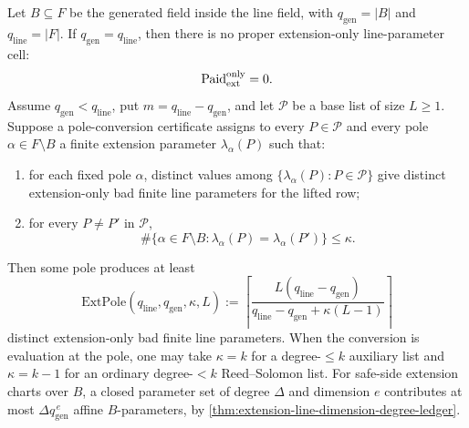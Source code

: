 \begin{proposition}\label{prop:v13-extension}
Let $B\subseteq F$ be the generated field inside the line field, with $q_{\mathrm{gen}}=|B|$ and $q_{\mathrm{line}}=|F|$.  If $q_{\mathrm{gen}}=q_{\mathrm{line}}$, then there is no proper extension-only line-parameter cell:
\[
        \operatorname{Paid}_{\mathrm{ext}}^{\mathrm{only}}=0.
\]
Assume $q_{\mathrm{gen}}<q_{\mathrm{line}}$, put $m=q_{\mathrm{line}}-q_{\mathrm{gen}}$, and let $\mathcal P$ be a base list of size $L\ge1$.  Suppose a pole-conversion certificate assigns to every $P\in\mathcal P$ and every pole $\alpha\in F\setminus B$ a finite extension parameter $\lambda_\alpha(P)$ such that:
\begin{enumerate}[label=\textup{(\roman*)}]
\item for each fixed pole $\alpha$, distinct values among $\{\lambda_\alpha(P):P\in\mathcal P\}$ give distinct extension-only bad finite line parameters for the lifted row;
\item for every $P\ne P'$ in $\mathcal P$,
\[
        \#\{\alpha\in F\setminus B:\lambda_\alpha(P)=\lambda_\alpha(P')\}\le \kappa .
\]
\end{enumerate}
Then some pole produces at least
\[
        \mathrm{ExtPole}(q_{\mathrm{line}},q_{\mathrm{gen}},\kappa,L)
        :=
        \left\lceil
        \frac{L(q_{\mathrm{line}}-q_{\mathrm{gen}})}
        {q_{\mathrm{line}}-q_{\mathrm{gen}}+\kappa(L-1)}
        \right\rceil
\]
distinct extension-only bad finite line parameters.  When the conversion is evaluation at the pole, one may take $\kappa=k$ for a degree-$\le k$ auxiliary list and $\kappa=k-1$ for an ordinary degree-$<k$ Reed--Solomon list.  For safe-side extension charts over $B$, a closed parameter set of degree $\Delta$ and dimension $e$ contributes at most $\Delta q_{\mathrm{gen}}^{\,e}$ affine $B$-parameters, by \cref{thm:extension-line-dimension-degree-ledger}.
\end{proposition}

